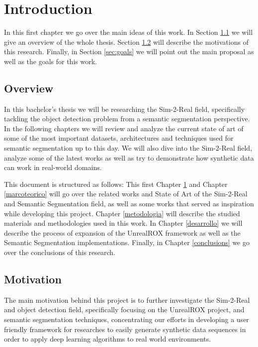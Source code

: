 
\chapter{Introduction}
\label{introduction}
In this first chapter we go over the main ideas of this work. In Section \ref{sec:overview} we will give an overview of the whole thesis. Section \ref{sec:motivation} will describe the motivations of this research. Finally, in Section \ref{sec:goals} we will point out the main proposal as well as the goals for this work.

\section{Overview}
\label{sec:overview}
In this bachelor's thesis we will be researching the Sim-2-Real field, specifically tackling the object detection problem from a semantic segmentation perspective. In the following chapters we will review and analyze the current state of art of some of the most important datasets, architectures and techniques used for semantic segmentation up to this day. We will also dive into the Sim-2-Real field, analyze some of the latest works as well as try to demonstrate how synthetic data can work in real-world domains.

This document is structured as follows: This first Chapter \ref{introduction} and Chapter \ref{marcoteorico} will go over the related works and State of Art of the Sim-2-Real and Semantic Segmentation field, as well as some works that served as inspiration while developing this project. Chapter \ref{metodologia} will describe the studied materials and methodologies used in this work. In Chapter \ref{desarrollo} we will describe the process of expansion of the UnrealROX framework as well as the Semantic Segmentation implementations. Finally, in Chapter \ref{conclusions} we go over the conclusions of this research.

\section{Motivation}
\label{sec:motivation}
The main motivation behind this project is to further investigate the Sim-2-Real and object detection field, specifically focusing on the UnrealROX project, and semantic segmentation techniques, concentrating our efforts in developing a user friendly framework for researches to easily generate synthetic data sequences in order to apply deep learning algorithms to real world environments.

